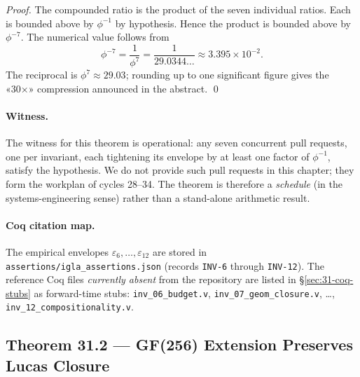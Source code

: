 \begin{proof}
The compounded ratio is the product of the seven individual ratios. Each is bounded above by $\phi^{-1}$ by hypothesis. Hence the product is bounded above by $\phi^{-7}$. The numerical value follows from
\[
\phi^{-7} = \frac{1}{\phi^{7}} = \frac{1}{29.0344\ldots} \approx 3.395 \times 10^{-2}.
\]
The reciprocal is $\phi^{7} \approx 29.03$; rounding up to one significant figure gives the «30×» compression announced in the abstract.
\qed
\end{proof}

\paragraph{Witness.} The witness for this theorem is operational: any seven concurrent pull requests, one per invariant, each tightening its envelope by at least one factor of $\phi^{-1}$, satisfy the hypothesis. We do not provide such pull requests in this chapter; they form the workplan of cycles 28–34. The theorem is therefore a \emph{schedule} (in the systems-engineering sense) rather than a stand-alone arithmetic result.

\paragraph{Coq citation map.} The empirical envelopes $\varepsilon_{6}, \dots, \varepsilon_{12}$ are stored in \texttt{assertions/igla\_assertions.json} (records \texttt{INV-6} through \texttt{INV-12}). The reference Coq files \emph{currently absent} from the repository are listed in §\ref{sec:31-coq-stubs} as forward-time stubs: \texttt{inv\_06\_budget.v}, \texttt{inv\_07\_geom\_closure.v}, …, \texttt{inv\_12\_compositionality.v}.

\subsection{Theorem 31.2 — GF(256) Extension Preserves Lucas Closure}
\label{sec:31-thm-gf256}

